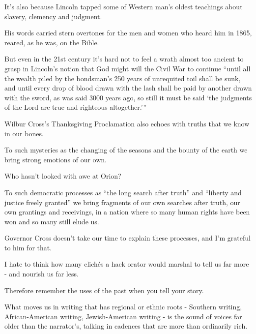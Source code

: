 \documentclass{book}
\numberwithin{equation}{section}
\begin{document}
It's also because Lincoln tapped some of Western man's oldest teachings about slavery, clemency and judgment.

His words carried stern overtones for the men and women who heard him in 1865, reared, as he was, on the Bible.

But even in the 21st century it's hard not to feel a wrath almost too ancient to grasp in Lincoln's notion that God might will the Civil War to continue ``until all the wealth piled by the bondsman's 250 years of unrequited toil shall be sunk, and until every drop of blood drawn with the lash shall be paid by another drawn with the sword, as was said 3000 years ago, so still it must be said `the judgments of the Lord are true and righteous altogether.'''

%
Wilbur Cross's Thanksgiving Proclamation also echoes with truths that we know in our bones.

To such mysteries as the changing of the seasons and the bounty of the earth we bring strong emotions of our own.

Who hasn't looked with awe at Orion?

To such democratic processes as ``the long search after truth'' and ``liberty and justice freely granted'' we bring fragments of our own searches after truth, our own grantings and receivings, in a nation where so many human rights have been won and so many still elude us.

Governor Cross doesn't take our time to explain these processes, and I'm grateful to him for that.

I hate to think how many clich\'es a hack orator would marshal to tell us far more - and nourish us far less.

Therefore remember the uses of the past when you tell your story.

What moves us in writing that has regional or ethnic roots - Southern writing, African-American writing, Jewish-American writing - is the sound of voices far older than the narrator's, talking in cadences that are more than ordinarily rich.
\end{document}
